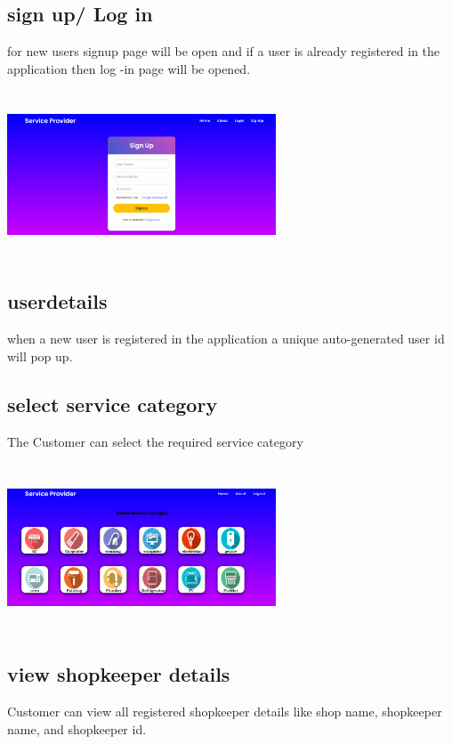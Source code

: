 \documentclass[conference]{IEEEtran}
\begin{document}
\subsection{sign up/ Log in}
for new users signup page will be open
and if a user is already registered in the application then log
-in page will be opened.
\graphicspath{ {./signup/} }
\includegraphics[width=8cm , height=5cm]{signup}

\subsection{userdetails}
when a new user is registered in the
application a unique auto-generated user id will pop up.

\subsection{select service category}
The Customer can select the required service category
\graphicspath{ {./category/} }
\includegraphics[width=8cm , height=5cm]{category}

\subsection{view shopkeeper details}
Customer can view all registered shopkeeper details like shop name, shopkeeper name, and
shopkeeper id.
\end{document}
